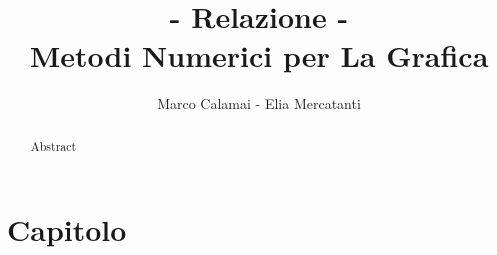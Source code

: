 \documentclass[]{report}
\title{\textbf{- Relazione -\\ Metodi Numerici per La Grafica\\ }}
\author{Marco Calamai - Elia Mercatanti}
\begin{document}
\maketitle

\chapter{Capitolo}


\begin{abstract}
	Abstract
\end{abstract}
\end{document}

